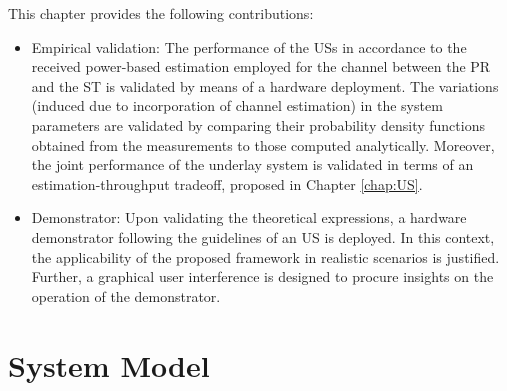 This chapter provides the following contributions:
\begin{itemize}
	\item Empirical validation: The performance of the USs in accordance to the received power-based estimation employed for the channel between the PR and the ST is validated by means of a hardware deployment. The variations (induced due to incorporation of channel estimation) in the system parameters are validated by comparing their probability density functions obtained from the measurements to those computed analytically. Moreover, the joint performance of the underlay system is validated in terms of an estimation-throughput tradeoff, proposed in Chapter \ref{chap:US}. %
	\item Demonstrator: Upon validating the theoretical expressions, a hardware demonstrator following the guidelines of an US is deployed. In this context, the applicability of the proposed framework in realistic scenarios is justified. Further, a graphical user interference is designed to procure insights on the operation of the demonstrator.	
\end{itemize}



\section{System Model}
\label{sysmod}

